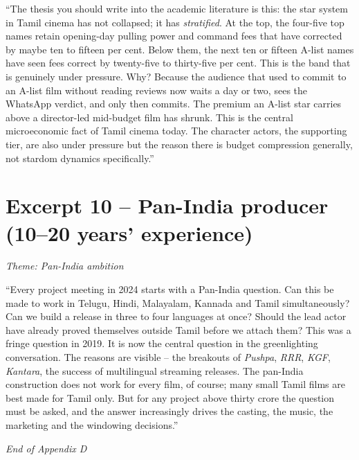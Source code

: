 ``The thesis you should write into the academic literature is this:
the star system in Tamil cinema has not collapsed; it has
\emph{stratified}.  At the top, the four-five top names retain
opening-day pulling power and command fees that have corrected by
maybe ten to fifteen per cent.  Below them, the next ten or fifteen
A-list names have seen fees correct by twenty-five to thirty-five
per cent.  This is the band that is genuinely under pressure.  Why?
Because the audience that used to commit to an A-list film without
reading reviews now waits a day or two, sees the WhatsApp verdict,
and only then commits.  The premium an A-list star carries above a
director-led mid-budget film has shrunk.  This is the central
microeconomic fact of Tamil cinema today.  The character actors,
the supporting tier, are also under pressure but the reason there
is budget compression generally, not stardom dynamics
specifically.''

\section*{Excerpt 10 -- Pan-India producer (10--20 years' experience)}
\textit{Theme: Pan-India ambition}
\medskip

``Every project meeting in 2024 starts with a Pan-India question.
Can this be made to work in Telugu, Hindi, Malayalam, Kannada and
Tamil simultaneously?  Can we build a release in three to four
languages at once?  Should the lead actor have already proved
themselves outside Tamil before we attach them?  This was a
fringe question in 2019.  It is now the central question in the
greenlighting conversation.  The reasons are visible -- the
breakouts of \textit{Pushpa}, \textit{RRR}, \textit{KGF},
\textit{Kantara}, the success of multilingual streaming releases.
The pan-India construction does not work for every film, of course;
many small Tamil films are best made for Tamil only.  But for any
project above thirty crore the question must be asked, and the
answer increasingly drives the casting, the music, the marketing
and the windowing decisions.''

\bigskip
\noindent
\textit{End of Appendix D}

